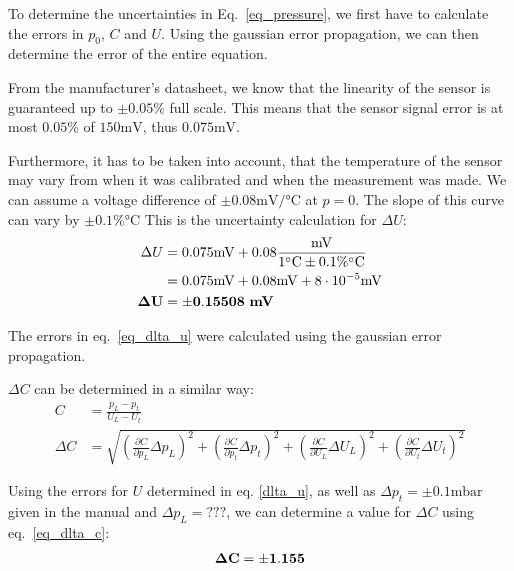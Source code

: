     To determine the uncertainties in Eq.~\ref{eq_pressure}, we first have to calculate the errors in $p_0$, $C$ and $U$.
    Using the gaussian error propagation, we can then determine the error of the entire equation.


    From the manufacturer's datasheet, we know that the linearity of the sensor is guaranteed up to $\pm 0.05\%$ full scale.
    This means that the sensor signal error is at most $0.05\%$ of $150\si{\milli\volt}$, thus $0.075\si{\milli\volt}$.

    Furthermore, it has to be taken into account, that the temperature of the sensor may vary from when
    it was calibrated and when the measurement was made. We can assume a voltage difference of $\pm 0.08\si{\milli\volt}/\si{\celsius}$ at $p = 0$.
    The slope of this curve can vary by $\pm 0.1\% \si{\celsius}$
    This is the uncertainty calculation for $\Delta U$:
    \begin{align}
        \Delta U &= 0.075 \si{\milli\volt} + 0.08 \frac{\si{\milli\volt}}{1 \si{\celsius} \pm 0.1 \% \si{\celsius}}\\
        &= 0.075 \si{\milli\volt} + 0.08 \si{\milli\volt} + 8 \cdot 10^{-5} \si{\milli\volt} \label{eq_dlta_u}\\
        \bf \Delta U &= \bf \pm 0.15508 ~\si{\bf\milli\volt} \label{dlta_u}
    \end{align}

    The errors in eq.~\ref{eq_dlta_u} were calculated using the gaussian error propagation.

    $\Delta C$ can be determined in a similar way:
    \begin{align}
        C &= \frac{p_L - p_t}{U_L - U_t}\\
        \Delta C &= \sqrt{ \left(\frac{\partial C}{\partial p_L} \Delta p_L \right)^2 +
                        \left(\frac{\partial C}{\partial p_t} \Delta p_t \right)^2 +
                        \left(\frac{\partial C}{\partial U_L} \Delta U_L \right)^2 +
                        \left(\frac{\partial C}{\partial U_t} \Delta U_t \right)^2 } \label{eq_dlta_c}
    \end{align}

    Using the errors for $U$ determined in eq. \ref{dlta_u}, as well as $\Delta p_t = \pm 0.1 \si{\milli\bar}$ given in the manual and $\Delta p_L = \textbf{???}$,
    we can determine a value for $\Delta C$ using eq.~\ref{eq_dlta_c}:
    \begin{align}
        \bf \Delta C = \pm 1.155 \label{dlta_c}
    \end{align}

